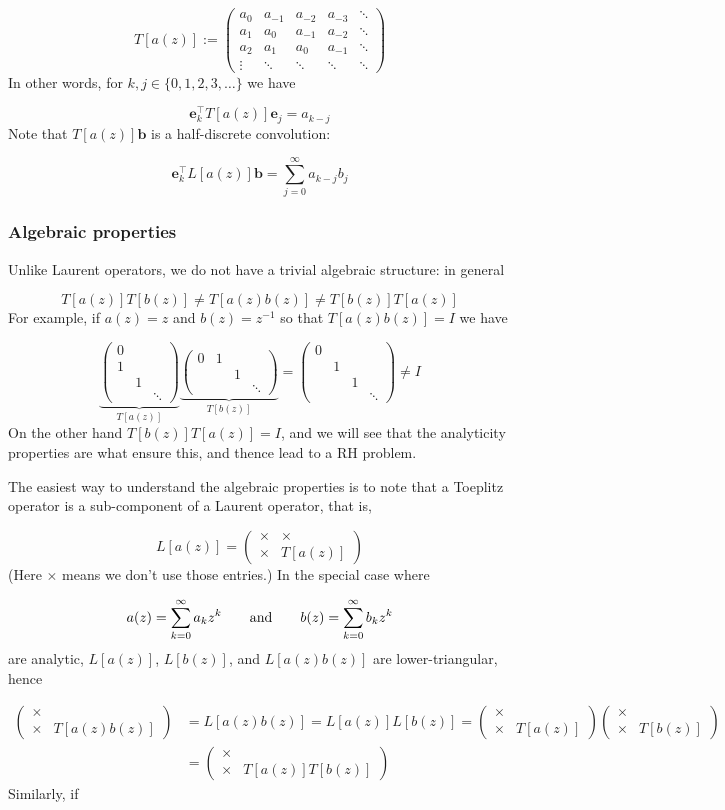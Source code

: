 \documentclass[12pt,landscape]{article}
\def\qqand{\qquad\hbox{and}\qquad}
\def\vc#1{ {\mathbf #1} }
\def\addtab#1={#1\;&=}
\def\ccr{\\\addtab}
\def\sopmatrix#1{ \begin{pmatrix}#1\end{pmatrix} }
\def\addtab#1={#1\;&=}
\def\ccr{\\\addtab}
\begin{document}
{\[
T[a(z)] := \sopmatrix{
 a_0 & a_{-1} & a_{-2} & a_{-3} & \ddots \\
 a_1 & a_0 & a_{-1} & a_{-2} & \ddots \\
 a_2 & a_1 & a_0 & a_{-1}   & \ddots \\
\vdots & \ddots& \ddots& \ddots & \ddots
}
\]
In other words, for $k,j \in \{0,1,2,3,\dots \}$ we have

\[
\vc e_k^\top T[a(z)] \vc e_j = a_{k-j}
\]
Note that $T[a(z)] \vc b$ is a half-discrete convolution:

\[
\vc e_k^\top L[a(z)] \vc b = \sum_{j=0}^\infty a_{k-j} b_j
\]
\subsubsection{Algebraic properties}
Unlike Laurent operators, we do not have a trivial algebraic structure: in general

\[
T[a(z)] T[b(z)] \neq T[a(z) b(z)] \neq T[b(z)] T[a(z)]
\]
For example, if $a(z) = z$ and $b(z) = z^{-1}$ so that $T[a(z)b(z)] = I$ we have

\[
\underbrace{\sopmatrix{0 \\ 1 \\ & 1 \\ &&\ddots}}_{T[a(z)]} \underbrace{\sopmatrix{0 & 1 \\ & & 1 \\ &&&\ddots}}_{T[b(z)]} = \sopmatrix{0 \\ & 1 \\ && 1 \\ &&& \ddots} \neq I
\]
On the other hand $T[b(z)] T[a(z)] = I$, and we will see that the analyticity properties are what ensure this, and thence lead to a RH problem.

The easiest way to understand the algebraic properties is to note that a Toeplitz operator is a sub-component of a Laurent operator, that is,

\[
L[a(z)] = \sopmatrix{
\times & \times \\ \times & T[a(z)]
}
\]
(Here $\times$ means we don't use those entries.) 
\newpage
In the special case where

\[
a(z) = \sum_{k=0}^\infty a_k z^k \qqand b(z) = \sum_{k=0}^\infty b_k z^k
\]
are analytic, $L[a(z)]$, $L[b(z)]$, and $L[a(z) b(z)]$ are lower-triangular, hence


\begin{align*}
\sopmatrix{
\times &  \\ \times & T[a(z) b(z)]
} &= L[a(z)b(z)] = L[a(z)] L[b(z)] =  \sopmatrix{
\times &  \\ \times & T[a(z)]
} \sopmatrix{
\times &  \\ \times & T[b(z)]
} \ccr
= \sopmatrix{
\times &  \\ \times & T[a(z)] T[b(z)]
}
\end{align*}
Similarly, if

}
\end{document}
